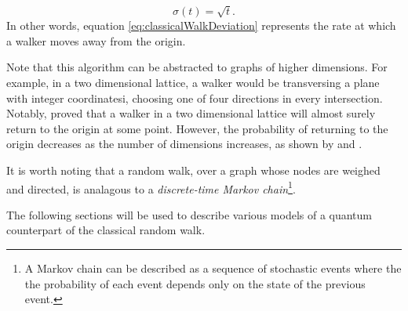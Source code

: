 \documentclass[../../dissertation.tex]{subfiles}
\begin{document}
\begin{equation}
	\sigma(t) = \sqrt{t}.
	\label{eq:classicalWalkDeviation}
\end{equation}
In other words, equation \ref{eq:classicalWalkDeviation} represents the rate at which a walker moves away from the origin.\par
Note that this algorithm can be abstracted to graphs of higher dimensions. For example, in a two dimensional lattice, a walker would be transversing a plane with integer coordinatesi, choosing one of four directions in every intersection. Notably, \cite{polya1921} proved that a walker in a two dimensional lattice will almost surely return to the origin at some point. However, the probability of returning to the origin decreases as the number of dimensions increases, as shown by \cite{montrol1956} and \cite{finch2003}.\par
It is worth noting that a random walk, over a graph whose nodes are weighed and directed, is analagous to a \textit{discrete-time Markov chain}\footnote{A Markov chain can be described as a sequence of stochastic events where the the probability of each event depends only on the state of the previous event.}.\par
The following sections will be used to describe various models of a quantum counterpart of the classical random walk. 
\end{document}
